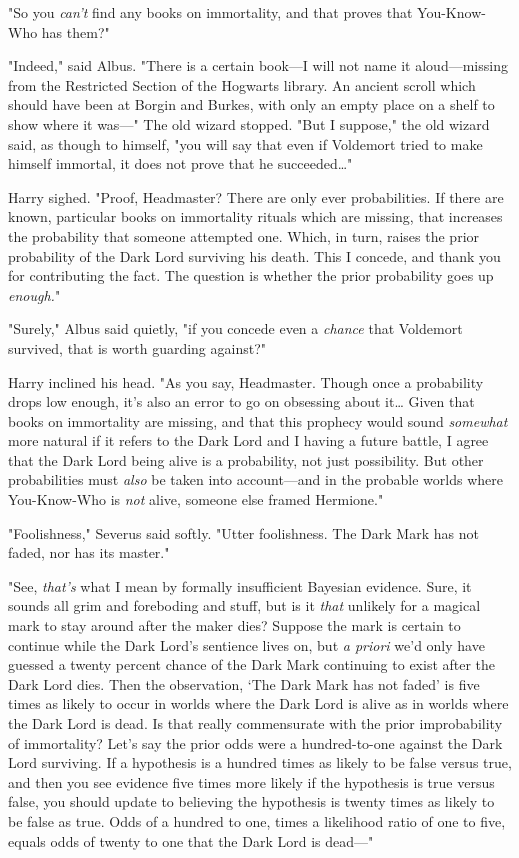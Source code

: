 "So you \emph{can't} find any books on immortality, and that proves that
You-Know-Who has them?"

"Indeed," said Albus. "There is a certain book---I will not name it
aloud---missing from the Restricted Section of the Hogwarts library. An ancient
scroll which should have been at Borgin and Burkes, with only an empty place on
a shelf to show where it was---" The old wizard stopped. "But I suppose," the
old wizard said, as though to himself, "you will say that even if Voldemort
tried to make himself immortal, it does not prove that he succeeded{\ldots}"

Harry sighed. "Proof, Headmaster? There are only ever probabilities. If there
are known, particular books on immortality rituals which are missing, that
increases the probability that someone attempted one. Which, in turn, raises
the prior probability of the Dark Lord surviving his death. This I concede, and
thank you for contributing the fact. The question is whether the prior
probability goes up \emph{enough.}"

"Surely," Albus said quietly, "if you concede even a \emph{chance} that
Voldemort survived, that is worth guarding against?"

Harry inclined his head. "As you say, Headmaster. Though once a probability
drops low enough, it's also an error to go on obsessing about it{\ldots} Given
that books on immortality are missing, and that this prophecy would sound
\emph{somewhat} more natural if it refers to the Dark Lord and I having a
future battle, I agree that the Dark Lord being alive is a probability, not
just possibility. But other probabilities must \emph{also} be taken into
account---and in the probable worlds where You-Know-Who is \emph{not} alive,
someone else framed Hermione."

"Foolishness," Severus said softly. "Utter foolishness. The Dark Mark has not
faded, nor has its master."

"See, \emph{that's} what I mean by formally insufficient Bayesian evidence.
Sure, it sounds all grim and foreboding and stuff, but is it \emph{that}
unlikely for a magical mark to stay around after the maker dies? Suppose the
mark is certain to continue while the Dark Lord's sentience lives on, but
\emph{a priori} we'd only have guessed a twenty percent chance of the Dark Mark
continuing to exist after the Dark Lord dies. Then the observation, `The Dark
Mark has not faded' is five times as likely to occur in worlds where the Dark
Lord is alive as in worlds where the Dark Lord is dead. Is that really
commensurate with the prior improbability of immortality? Let's say the prior
odds were a hundred-to-one against the Dark Lord surviving. If a hypothesis is
a hundred times as likely to be false versus true, and then you see evidence
five times more likely if the hypothesis is true versus false, you should
update to believing the hypothesis is twenty times as likely to be false as
true. Odds of a hundred to one, times a likelihood ratio of one to five, equals
odds of twenty to one that the Dark Lord is dead---"

